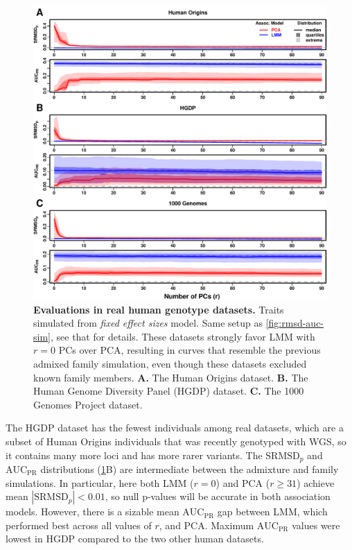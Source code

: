 \documentclass[11pt]{article}
\newcommand{\rmsd}{\text{SRMSD}_p}
\newcommand{\auc}{\text{AUC}_\text{PR}}
\begin{document}
\begin{figure}[bp!]
  \centering
  \includegraphics[width=\textwidth,height=\textheight,keepaspectratio]{fes/rmsd-auc-real.pdf}
  \caption{
    {\small 
      {\bf Evaluations in real human genotype datasets.}
      Traits simulated from \textit{fixed effect sizes} model.
      Same setup as \cref{fig:rmsd-auc-sim}, see that for details.
      These datasets strongly favor LMM with $r = 0$ PCs over PCA, resulting in curves that resemble the previous admixed family simulation, even though these datasets excluded known family members.
      \textbf{A.}
      The Human Origins dataset.
      \textbf{B.}
      The Human Genome Diversity Panel (HGDP) dataset.
      \textbf{C.}
      The 1000 Genomes Project dataset.
    }
  }
  \label{fig:rmsd-auc-real}
\end{figure}

The HGDP dataset has the fewest individuals among real datasets, which are a subset of Human Origins individuals that was recently genotyped with WGS, so it contains many more loci and has more rarer variants.
The $\rmsd$ and $\auc$ distributions (\cref{fig:rmsd-auc-real}B) are intermediate between the admixture and family simulations.
In particular, here both LMM ($r=0$) and PCA ($r \ge 31$) achieve mean $|\rmsd| < 0.01$, so null p-values will be accurate in both association models.
However, there is a sizable mean $\auc$ gap between LMM, which performed best across all values of $r$, and PCA.
Maximum $\auc$ values were lowest in HGDP compared to the two other human datasets.
\end{document}
